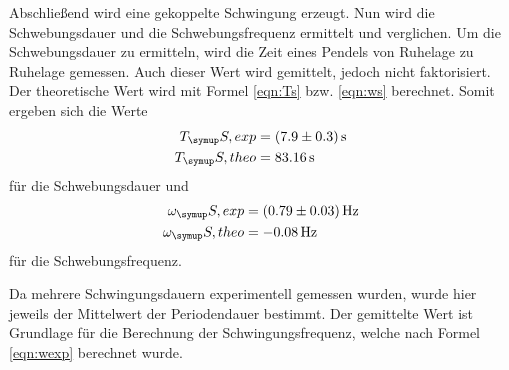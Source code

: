 Abschließend wird eine gekoppelte Schwingung erzeugt. Nun wird die
Schwebungsdauer und die Schwebungsfrequenz ermittelt und verglichen. Um die
Schwebungsdauer zu ermitteln, wird die Zeit eines Pendels von Ruhelage zu
Ruhelage gemessen. Auch dieser Wert wird gemittelt, jedoch nicht faktorisiert.
Der theoretische Wert wird mit Formel \eqref{eqn:Ts} bzw. \eqref{eqn:ws} berechnet.
Somit ergeben
sich die Werte
\begin{align*}
  T_\su{S, exp} &= (7.9\pm0.3)\sek \\
  T_\su{S,theo} &= 83.16\sek
\end{align*}
für die Schwebungsdauer und
\begin{align*}
  \omega_\su{S, exp} &= (0.79 \pm 0.03)\Hz \\
  \omega_\su{S, theo}&= -0.08\Hz
\end{align*}
für die Schwebungsfrequenz.

Da mehrere Schwingungsdauern experimentell gemessen wurden, wurde hier jeweils
der Mittelwert der Periodendauer bestimmt. Der gemittelte Wert ist Grundlage für
die Berechnung der Schwingungsfrequenz, welche nach Formel \eqref{eqn:wexp}
berechnet wurde.
